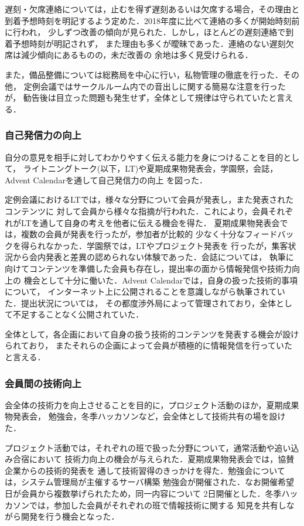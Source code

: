 遅刻・欠席連絡については，止むを得ず遅刻あるいは欠席する場合，その理由と
到着予想時刻を明記するよう定めた．2018年度に比べて連絡の多くが開始時刻前に行われ，
少しずつ改善の傾向が見られた．しかし，ほとんどの遅刻連絡で到着予想時刻が明記されず，
また理由も多くが曖昧であった．連絡のない遅刻欠席は減少傾向にあるものの，未だ改善の
余地は多く見受けられる．

また，備品整備については総務局を中心に行い，私物管理の徹底を行った．その他，
定例会議ではサークルルーム内での音出しに関する簡易な注意を行ったが，
勧告後は目立った問題も発生せず，全体として規律は守られていたと言える．

\subsubsection*{自己発信力の向上}
自分の意見を相手に対してわかりやすく伝える能力を身につけることを目的として，
ライトニングトーク(以下，LT)や夏期成果物発表会，学園祭，会誌，Advent Calendarを通して自己発信力の向上
を図った．

定例会議におけるLTでは，様々な分野について会員が発表し，また発表されたコンテンツに
対して会員から様々な指摘が行われた．これにより，会員それぞれがLTを通して自身の考えを他者に伝える機会を得た．
夏期成果物発表会では，複数の会員が発表を行ったが，参加者が比較的
少なく十分なフィードバックを得られなかった．学園祭では，LTやプロジェクト発表を
行ったが，集客状況から会内発表と差異の認められない体験であった．会誌については，
執筆に向けてコンテンツを準備した会員も存在し，提出率の面から情報発信や技術力向上の
機会として十分に働いた．Advent Calendarでは，自身の扱った技術的事項について，
インターネット上に公開されることを意識しながら執筆されていた．提出状況については，
その都度渉外局によって管理されており，全体として不足することなく公開されていた．

全体として，各企画において自身の扱う技術的コンテンツを発表する機会が設けられており，
またそれらの企画によって会員が積極的に情報発信を行っていたと言える．

\subsubsection*{会員間の技術向上}
会全体の技術力を向上させることを目的に，プロジェクト活動のほか，夏期成果物発表会，
勉強会，冬季ハッカソンなど，会全体として技術共有の場を設けた．

プロジェクト活動では，それぞれの班で扱った分野について，通常活動や追い込み合宿において
技術力向上の機会が与えられた．夏期成果物発表会では，協賛企業からの技術的発表を
通して技術習得のきっかけを得た．勉強会については，システム管理局が主催するサーバ構築
勉強会が開催された．なお開催希望日が会員から複数挙げられたため，同一内容について
2日開催とした．冬季ハッカソンでは，参加した会員がそれぞれの班で情報技術に関する
知見を共有しながら開発を行う機会となった．

